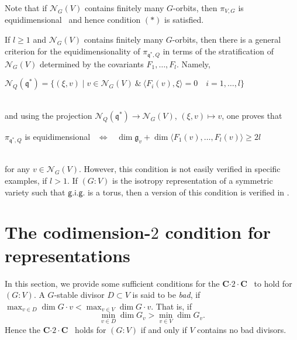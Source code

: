 Note that if ${{\mathcal N}}_G(V)$ contains finitely many $G$-orbits, then $\pi_{V,G}$ is 
equidimensional~\cite[\S\,5.2]{VP} and hence condition {\color{MIXT}$(\ast)$} is satisfied. 
\begin{rema} 
If $l{\geqslant} 1$ and ${{\mathcal N}}_G(V)$ contains finitely many $G$-orbits, then there is a general criterion for the equidimensionality of $\pi_{{{\mathfrak q}}^*,Q}$ in terms of the stratification of ${{\mathcal N}}_G(V)$ determined by the covariants $F_1,\dots, F_l$. Namely, \\[.5ex]
\centerline{
  ${{\mathcal N}}_Q({{\mathfrak q}}^*)=\{(\xi,v)\mid v\in {{\mathcal N}}_G(V) \ \& \    
   \langle F_i(v),\xi\rangle=0 \quad i=1,\dots,l\}$}
\\[.5ex]
and using the  projection ${{\mathcal N}}_Q({{\mathfrak q}}^*)\to {{\mathcal N}}_G(V)$, $(\xi,v)\mapsto v$, one proves that 
\\[.5ex]
\centerline{$\pi_{{{\mathfrak q}}^*,Q}$ is equidimensional \ $\Longleftrightarrow$ \  
$\dim{{\mathfrak g}}_v+ \dim \langle F_1(v),\dots,F_l(v)\rangle {\geqslant} 2l$}
\\[.5ex]
for any $v\in{{\mathcal N}}_G(V)$. However, this condition is not easily verified in specific examples, if $l > 1$.
If $(G:V)$ is the isotropy representation of a symmetric variety such that ${\mathsf{g.i.g.}}$ is a torus, then a version of this condition is verified in \cite[Sect.\,5]{coadj}.
\end{rema}

\section{The codimension-$2$ condition for representations} 
\label{sect:codim2}

\noindent
In this section,  we provide some sufficient conditions for the {\textsf{\bfseries C${\cdot}2{\cdot}$C}\ } to hold for $(G:V)$.
A $G$-stable divisor $D\subset V$ is said to be {\it bad}, if 
$\max_{v\in D}\dim G{\cdot}v< \max_{v\in V}\dim G{\cdot}v$. 
That is, if
\[
     \min_{v\in D}\dim G_v> \min_{v\in V}\dim G_v .
\]
Hence the {\textsf{\bfseries C${\cdot}2{\cdot}$C}\ } holds for $(G:V)$  if and only if $V$ contains no bad divisors.

